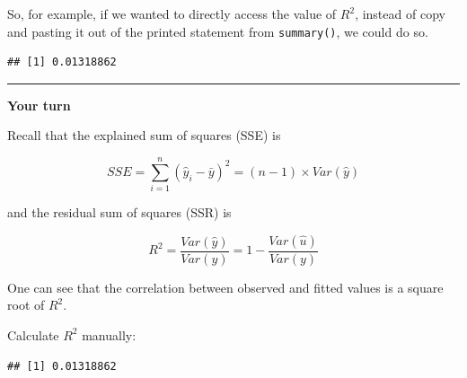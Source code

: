 \documentclass[]{book}
\newenvironment{Shaded}{\begin{snugshade}}{\end{snugshade}}
\newcommand{\DecValTok}[1]{\textcolor[rgb]{0.00,0.00,0.81}{#1}}
\newcommand{\KeywordTok}[1]{\textcolor[rgb]{0.13,0.29,0.53}{\textbf{#1}}}
\newcommand{\NormalTok}[1]{#1}
\newcommand{\OperatorTok}[1]{\textcolor[rgb]{0.81,0.36,0.00}{\textbf{#1}}}
\newcommand{\StringTok}[1]{\textcolor[rgb]{0.31,0.60,0.02}{#1}}
\begin{document}
So, for example, if we wanted to directly access the value of \(R^2\), instead of copy and pasting it out of the printed statement from \texttt{summary()}, we could do so.

\begin{Shaded}
\end{Shaded}

\begin{verbatim}
## [1] 0.01318862
\end{verbatim}

\begin{center}\rule{0.5\linewidth}{\linethickness}\end{center}

\textbf{Your turn}

Recall that the explained sum of squares (SSE) is

\begin{equation}
SSE = \sum_{i=1}^{n}(\hat{y}_{i} - \bar{y})^2 = (n-1) \times Var(\hat{y})
\label{eq:SSE}
\end{equation}

and the residual sum of squares (SSR) is

\begin{equation}
R^2 = \frac{Var(\hat{y})}{Var(y)} = 1 - \frac{Var(\hat{u})}{Var(y)} 
\label{eq:SSR}
\end{equation}

One can see that the correlation between observed and fitted values is a square root of \(R^2\).

Calculate \(R^2\) manually:

\begin{Shaded}
\end{Shaded}

\begin{verbatim}
## [1] 0.01318862
\end{verbatim}

\begin{Shaded}
\end{Shaded}
\end{document}
